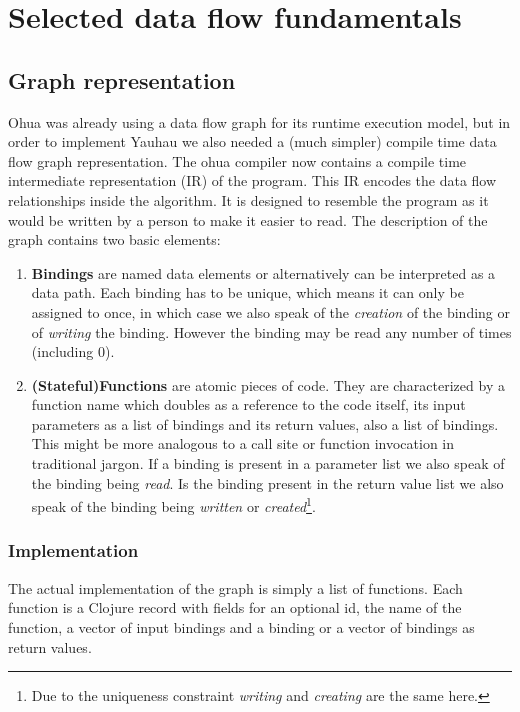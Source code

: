 \chapter{Selected data flow fundamentals}

\label{ChapterDataFlow}

\section{Graph representation}

Ohua was already using a data flow graph for its runtime execution model, but in order to implement Yauhau we also needed a (much simpler) compile time data flow graph representation.
The ohua compiler now contains a compile time intermediate representation (IR) of the program.
This IR encodes the data flow relationships inside the algorithm.
It is designed to resemble the program as it would be written by a person to make it easier to read.
The description of the graph contains two basic elements:
\begin{enumerate}
    \item \textbf{Bindings} are named data elements or alternatively can be interpreted as a data path. Each binding has to be unique, which means it can only be assigned to once, in which case we also speak of the \textit{creation} of the binding or of \textit{writing} the binding. However the binding may be read any number of times (including 0).
    \item \textbf{(Stateful)Functions} are atomic pieces of code. They are characterized by a function name which doubles as a reference to the code itself, its input parameters as a list of bindings and its return values, also a list of bindings.
    This might be more analogous to a call site or function invocation in traditional jargon.
    If a binding is present in a parameter list we also speak of the binding being \textit{read}.
    Is the binding present in the return value list we also speak of the binding being \textit{written} or \textit{created}\footnote{Due to the uniqueness constraint \textit{writing} and \textit{creating} are the same here.}.
\end{enumerate}

\subsection{Implementation}

The actual implementation of the graph is simply a list of functions. Each function is a Clojure record with fields for an optional id, the name of the function, a vector of input bindings and a binding or a vector of bindings as return values.

